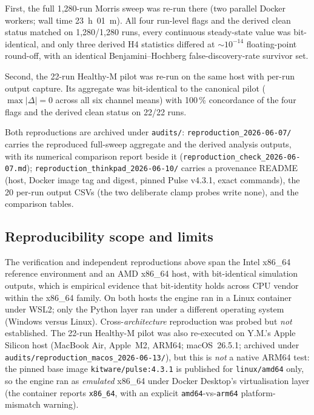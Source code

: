 \documentclass[pdflatex,sn-nature]{sn-jnl}%
\begin{document}
First, the full 1{,}280-run Morris sweep was re-run there (two parallel Docker workers; wall time 23~h~01~m). All four run-level flags and the derived clean status matched on 1{,}280/1{,}280 runs, every continuous steady-state value was bit-identical, and only three derived H4 statistics differed at $\sim 10^{-14}$ floating-point round-off, with an identical Benjamini--Hochberg false-discovery-rate survivor set.

Second, the 22-run Healthy-M pilot was re-run on the same host with per-run output capture. Its aggregate was bit-identical to the canonical pilot ($\max |\Delta| = 0$ across all six channel means) with 100\,\% concordance of the four flags and the derived clean status on 22/22 runs.

Both reproductions are archived under \texttt{audits/}: \texttt{reproduction\_2026-06-07/} carries the reproduced full-sweep aggregate and the derived analysis outputs, with its numerical comparison report beside it (\texttt{reproduction\_check\_2026-06-07.md}); \texttt{reproduction\_thinkpad\_2026-06-10/} carries a provenance README (host, Docker image tag and digest, pinned Pulse v4.3.1, exact commands), the 20 per-run output CSVs (the two deliberate clamp probes write none), and the comparison tables.

\subsection{Reproducibility scope and limits}\label{sec:s12-scope}

The verification and independent reproductions above span the Intel x86\_64 reference environment and an AMD x86\_64 host, with bit-identical simulation outputs, which is empirical evidence that bit-identity holds across CPU vendor within the x86\_64 family. On both hosts the engine ran in a Linux container under WSL2; only the Python layer ran under a different operating system (Windows versus Linux). Cross-\emph{architecture} reproduction was probed but \emph{not} established. The 22-run Healthy-M pilot was also re-executed on Y.M.'s Apple Silicon host (MacBook Air, Apple~M2, ARM64; macOS~26.5.1; archived under \texttt{audits/reproduction\_macos\_2026-06-13/}), but this is \emph{not} a native ARM64 test: the pinned base image \texttt{kitware/pulse:4.3.1} is published for \texttt{linux/amd64} only, so the engine ran as \emph{emulated} x86\_64 under Docker Desktop's virtualisation layer (the container reports \texttt{x86\_64}, with an explicit \texttt{amd64}-vs-\texttt{arm64} platform-mismatch warning).
\end{document}
